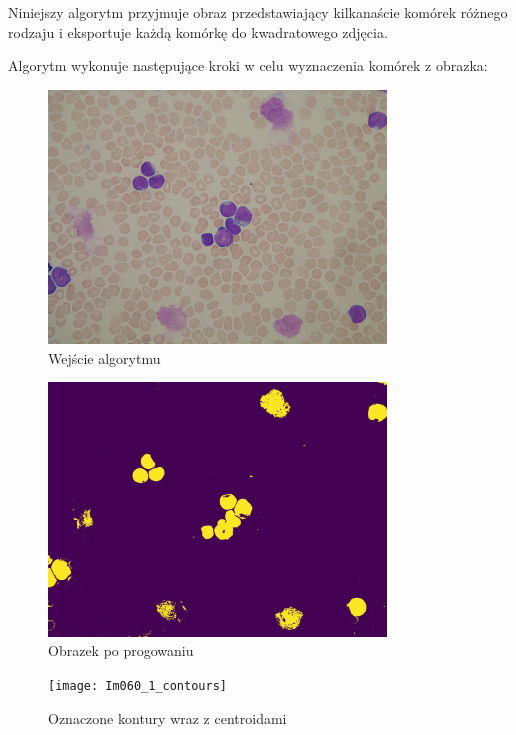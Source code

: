 Niniejszy algorytm przyjmuje obraz przedstawiający kilkanaście komórek różnego rodzaju i eksportuje
każdą komórkę do kwadratowego zdjęcia.
%

Algorytm wykonuje następujące kroki w celu wyznaczenia komórek z obrazka:

\begin{figure}
    \centering
    \includegraphics[width=0.8\textwidth]{Im060_1}
    \caption{Wejście algorytmu}
    \label{fig:extract_input}
\end{figure}

\begin{figure}
    \centering
    \includegraphics[width=0.8\textwidth]{Im060_1_thresh}
    \caption{Obrazek po progowaniu}
    \label{fig:extract_thresh}
\end{figure}

\begin{figure}
    \centering
    \texttt{[image: Im060\_1\_contours]}
    \caption{Oznaczone kontury wraz z centroidami}
    \label{fig:extract_contours}
\end{figure}

